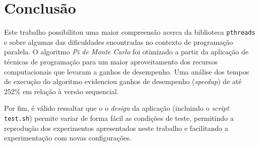 \documentclass[12pt,a4paper]{article}
\begin{document}
\section{Conclusão}
Este trabalho possibilitou uma maior compreensão acerca da biblioteca
\texttt{pthreads} e sobre algumas das dificuldades encontradas no contexto de
programação paralela. O algoritmo \textit{Pi de Monte Carlo} foi otimizado a
partir da aplicação de técnicas de programação para um maior aproveitamento dos
recursos computacionais que levaram a ganhos de desempenho. Uma análise dos
tempos de execução do algoritmo evidenciou ganhos de desempenho
(\textit{speedup}) de até 252\% em relação à versão sequencial.

Por fim, é válido ressaltar que o o \textit{design} da aplicação (incluindo o
\textit{script} \texttt{test.sh}) permite variar de forma fácil as condições de
teste, permitindo a reprodução dos experimentos apresentados neste trabalho e
facilitando a experimentação com novas configurações. 



\end{document}
